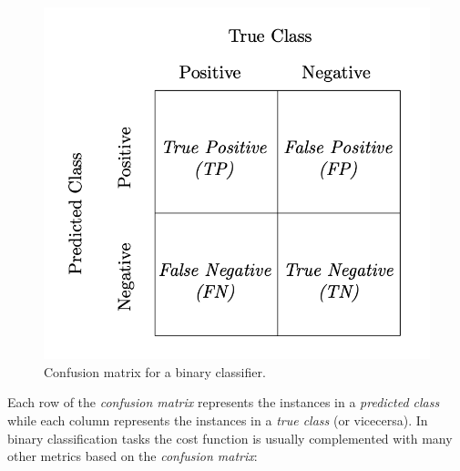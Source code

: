 \begin{figure}[h]
\centering
    \includegraphics[scale=0.5]{sections/Chapters/Machine-Learning/confusionmatrixdef.png}
\caption{Confusion matrix for a binary classifier.}
\end{figure}

Each row of the \textit{confusion matrix} represents the instances in a \textit{predicted class} while each column represents the instances 
in a \textit{true class} (or vicecersa).
In binary classification tasks the cost function is usually complemented with many other metrics based on the \textit{confusion matrix}:

